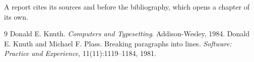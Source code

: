 \documentclass{report}
\begin{document}
A report cites its sources \cite{knuth84} and \cite{plass81} before the
bibliography, which opens a chapter of its own.

\begin{thebibliography}{9}
 Donald E. Knuth. \emph{Computers and Typesetting}. Addison-Wesley, 1984.
 Donald E. Knuth and Michael F. Plass. Breaking paragraphs
  into lines. \emph{Software: Practice and Experience}, 11(11):1119--1184, 1981.
\end{thebibliography}
\end{document}

